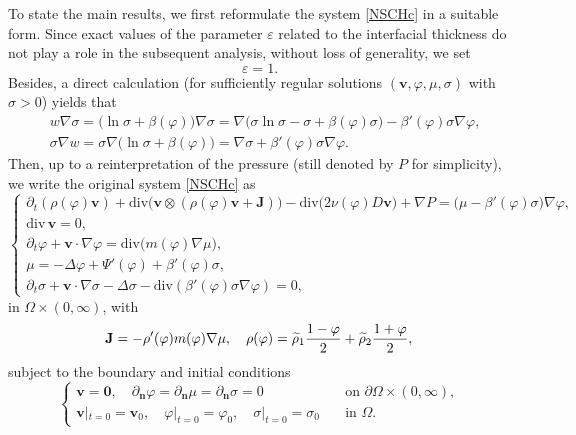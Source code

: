 \documentclass[11pt,reqno]{amsart}
\def\n{{\bm{n}}}
\def\div{\mathrm{div}}
\def\J{\mathbf{J}}
\def\vv{\bm{v}}
\begin{document}
To state the main results, we first reformulate the system \eqref{NSCHc} in a suitable form. Since exact values of the parameter $\varepsilon$ related to the interfacial thickness do not play a role in the subsequent analysis, without loss of generality, we set
$$\varepsilon=1.$$
Besides, a direct calculation (for sufficiently regular solutions $(\vv, \varphi, \mu, \sigma)$ with $\sigma>0$) yields that
%
\begin{align*}
&w \nabla \sigma
=
\big( \ln \sigma + \beta(\varphi)\big) \nabla \sigma
= \nabla \big(\sigma \ln \sigma -\sigma +\beta(\varphi) \sigma \big)
-\beta'(\varphi) \sigma \nabla \varphi,\\
&\sigma\nabla w = \sigma\nabla \big( \ln \sigma + \beta(\varphi)\big)= \nabla \sigma +\beta'(\varphi)\sigma\nabla\varphi.
\end{align*}
%
Then, up to a reinterpretation of the pressure (still denoted by $P$ for simplicity), we write the original system \eqref{NSCHc} as
%
\begin{equation}
 \label{NSCH}
\begin{cases}
\partial_t ( \rho(\varphi)\vv) + \div \big( \vv \otimes ( \rho(\varphi) \vv + \J) \big) - \div \big( 2\nu(\varphi) D \vv \big) + \nabla P = \big(\mu-\beta'(\varphi)  \sigma\big) \nabla \varphi,\\
\div \, \vv=0,\\
\partial_t \varphi +\vv\cdot \nabla \varphi = \div\big(m(\varphi)\nabla \mu\big),\\
\mu= - \Delta \varphi+ \Psi'(\varphi) + \beta'(\varphi) \sigma,\\
\partial_t \sigma + \vv \cdot \nabla \sigma - \Delta \sigma -\div \left( \beta'(\varphi)\sigma \nabla \varphi\right)=0,
\end{cases}
\end{equation}
%
in $\Omega \times (0,\infty)$,
%
with
$$
\J= -\rho'(\varphi) m(\varphi) \nabla \mu,\quad \rho(\varphi)= \widetilde{\rho}_1 \dfrac{1-\varphi}{2}+ \widetilde{\rho}_2 \dfrac{1+\varphi}{2},\\
$$
%
subject to the boundary and initial conditions
%
\begin{equation}
\label{NSCH-bic}
\begin{cases}
\vv=\mathbf{0}, \quad \partial_\n \varphi= \partial_\n \mu =\partial_\n \sigma=0 \quad &\text{on }  \partial \Omega \times (0,\infty),\\
\vv|_{t=0}=\vv_0, \quad \varphi|_{t=0}=\varphi_0, \quad \sigma|_{t=0}=\sigma_0 \quad &\text{in } \Omega.
\end{cases}
\end{equation}
\end{document}

